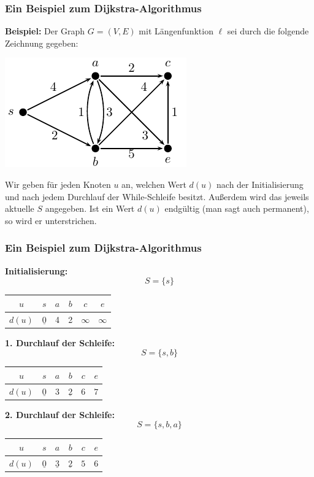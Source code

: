\documentclass[smaller]{beamer}
\begin{document}
\begin{frame}
\frametitle{Ein Beispiel zum Dijkstra-Algorithmus}
 \textbf{Beispiel:} Der Graph $G=(V,E)$ mit Längenfunktion $\ell$ sei durch die folgende Zeichnung gegeben:

\begin{center}
 \includegraphics{fig80.pdf}
\end{center}

Wir geben für jeden Knoten $u$ an, welchen Wert $d(u)$ nach der Initialisierung und nach jedem Durchlauf der While-Schleife besitzt. Außerdem wird das jeweils aktuelle $S$ angegeben. Ist ein Wert $d(u)$ endgültig (man sagt auch \alert{permanent}), so wird er unterstrichen.
\end{frame}

\begin{frame}
\frametitle{Ein Beispiel zum Dijkstra-Algorithmus}
\textbf{Initialisierung:}
\[
S = \big\{ s \big\}
\]
\begin{center}
\begin{tabular}{c|ccccc}
$u$ & $s$ & $a$ & $b$ & $c$ & $e$ \\ \hline
$d(u)$ & $\underline{0}$ & 4 & 2 & $\infty$ & $\infty$
\end{tabular}
\end{center}

\textbf{1. Durchlauf der Schleife:}
\[
S = \big\{ s,b \big\}
\]
\begin{center}
\begin{tabular}{c|ccccc}
$u$ & $s$ & $a$ & $b$ & $c$ & $e$ \\ \hline
$d(u)$ & $\underline{0}$ & $3$ & $\underline{2}$ & $6$ & $7$
\end{tabular}
\end{center}

\textbf{2. Durchlauf der Schleife:}
\[
S = \big\{ s,b,a \big\}
\]
\begin{center}
\begin{tabular}{c|ccccc}
$u$ & $s$ & $a$ & $b$ & $c$ & $e$ \\ \hline
$d(u)$ & $\underline{0}$ & $\underline{3}$ & $\underline{2}$ & $5$ & $6$
\end{tabular}
\end{center}
\end{frame}
\end{document}
